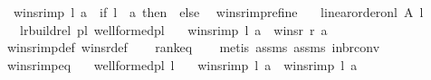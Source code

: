 \begin{isabellebody}
\ \ {\isachardoublequoteopen}winsr{\isacharunderscore}{\kern0pt}imp{\isacharprime}{\kern0pt}\ l\ a\ {\isasymequiv}\ {\isacharparenleft}{\kern0pt}if\ {\isacharparenleft}{\kern0pt}l{\isacharbang}{\kern0pt}{}\ {\isacharequal}{\kern0pt}\ a{\isacharparenright}{\kern0pt}\ then\ {}\ else\ {}{\isacharparenright}{\kern0pt}{\isachardoublequoteclose}\isanewline
\isanewline
{}\isamarkupfalse%
\ winsr{\isacharunderscore}{\kern0pt}imp{\isacharunderscore}{\kern0pt}refine{\isacharcolon}{\kern0pt}\isanewline
\ \ \ {\isachardoublequoteopen}linear{\isacharunderscore}{\kern0pt}order{\isacharunderscore}{\kern0pt}on{\isacharunderscore}{\kern0pt}l\ A\ l{\isachardoublequoteclose}\isanewline
\ \ \ {\isachardoublequoteopen}{\isacharparenleft}{\kern0pt}l{\isacharcomma}{\kern0pt}r{\isacharparenright}{\kern0pt}{\isasymin}build{\isacharunderscore}{\kern0pt}rel\ pl{\isacharunderscore}{\kern0pt}{\isasymalpha}\ well{\isacharunderscore}{\kern0pt}formed{\isacharunderscore}{\kern0pt}pl{\isachardoublequoteclose}\isanewline
\ \ \ {\isachardoublequoteopen}winsr{\isacharunderscore}{\kern0pt}imp\ l\ a\ {\isacharequal}{\kern0pt}\ {\isacharparenleft}{\kern0pt}winsr\ r\ a{\isacharparenright}{\kern0pt}{\isachardoublequoteclose}\isanewline
%
\isadelimproof
\ \ %
\endisadelimproof
%
\isatagproof
{}\isamarkupfalse%
\ winsr{\isacharunderscore}{\kern0pt}imp{\isacharunderscore}{\kern0pt}def\ winsr{\isacharunderscore}{\kern0pt}def\isanewline
\ \ \isamarkupfalse%
\ rankeq\isanewline
\ \ \isamarkupfalse%
\ {\isacharparenleft}{\kern0pt}metis\ assms{\isacharparenleft}{\kern0pt}{}{\isacharparenright}{\kern0pt}\ assms{\isacharparenleft}{\kern0pt}{}{\isacharparenright}{\kern0pt}\ in{\isacharunderscore}{\kern0pt}br{\isacharunderscore}{\kern0pt}conv{\isacharparenright}{\kern0pt}%
\endisatagproof
{\isafoldproof}%
%
\isadelimproof
\ \isanewline
%
\endisadelimproof
\isanewline
{}\isamarkupfalse%
\ winsr{\isacharunderscore}{\kern0pt}imp{\isacharprime}{\kern0pt}{\isacharunderscore}{\kern0pt}eq{\isacharcolon}{\kern0pt}\isanewline
\ \ \ {\isachardoublequoteopen}well{\isacharunderscore}{\kern0pt}formed{\isacharunderscore}{\kern0pt}pl\ l{\isachardoublequoteclose}\isanewline
\ \ \ {\isachardoublequoteopen}winsr{\isacharunderscore}{\kern0pt}imp{\isacharprime}{\kern0pt}\ l\ a\ {\isacharequal}{\kern0pt}\ {\isacharparenleft}{\kern0pt}winsr{\isacharunderscore}{\kern0pt}imp\ l\ a{\isacharparenright}{\kern0pt}{\isachardoublequoteclose}\isanewline

\end{isabellebody}

